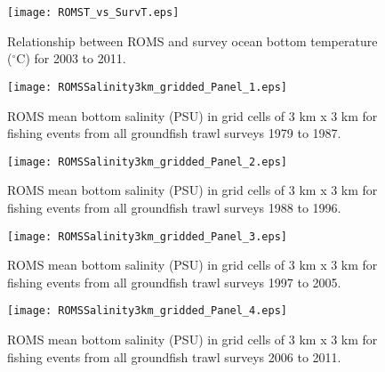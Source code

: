 \documentclass[11pt]{book}\usepackage[]{graphicx}\usepackage[]{color}
\begin{document}
\newpage


\graphicspath{{c:/GitHub/SPERA-Maps/Results/Figures/}}
\begin{figure}[!htp]
\begin{center}
\texttt{[image: ROMST\_vs\_SurvT.eps]}
\end{center}
\caption{Relationship between ROMS and survey ocean bottom temperature ($^\circ$C) for 2003 to 2011.}
\label{fig:ROMSsurvT}
\end{figure}

\newpage 

\begin{figure}[!htp]
\begin{center}
\texttt{[image: ROMSSalinity3km\_gridded\_Panel\_1.eps]}
\end{center}

\caption{ROMS mean bottom salinity (PSU) in grid cells of 3 km x 3 km for fishing events from all groundfish trawl surveys 1979 to 1987.}
\label{fig:ROMSsal79to87}
\end{figure}

\newpage

\begin{figure}[!htp]
\ContinuedFloat
\begin{center}
\texttt{[image: ROMSSalinity3km\_gridded\_Panel\_2.eps]}
\end{center}

\caption{ROMS mean bottom salinity (PSU) in grid cells of 3 km x 3 km for fishing events from all groundfish trawl surveys 1988 to 1996.}
\label{fig:ROMSsal88to96}
\end{figure}

\newpage

\begin{figure}[!htp]
\ContinuedFloat
\begin{center}
\texttt{[image: ROMSSalinity3km\_gridded\_Panel\_3.eps]}
\end{center}

\caption{ROMS mean bottom salinity (PSU) in grid cells of 3 km x 3 km for fishing events from all groundfish trawl surveys 1997 to 2005.}
\label{fig:ROMSsal97to05}
\end{figure}

\newpage

\begin{figure}[!htp]
\ContinuedFloat
\begin{center}
\texttt{[image: ROMSSalinity3km\_gridded\_Panel\_4.eps]}
\end{center}

\caption{ROMS mean bottom salinity (PSU) in grid cells of 3 km x 3 km for fishing events from all groundfish trawl surveys 2006 to 2011.}
\label{fig:ROMSsal06to11}
\end{figure}
\end{document}
